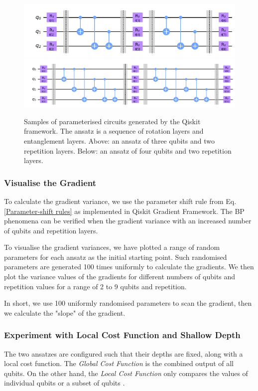 \begin{figure}
    \includegraphics[width=\textwidth]{Artefact/Appendices/ansatz3-2.png}
    \includegraphics[width=\textwidth]{Artefact/Appendices/ansatz4-2.png}
    \caption{
        Samples of parameterised circuits generated by the Qiskit framework.
        The ansatz is a sequence of rotation layers and entanglement layers.
        Above: an ansatz of three qubits and two repetition layers.
        Below: an ansatz of four qubits and two repetition layers.
    }
    \label{Ansatz samples}
\end{figure}

\subsubsection{Visualise the Gradient}
To calculate the gradient variance, we use the parameter shift rule from Eq. \ref{Parameter-shift rules} as implemented in Qiskit Gradient Framework.
The BP phenomena can be verified when the gradient variance with an increased number of qubits and repetition layers.

To visualise the gradient variances, we have plotted a range of random parameters for each ansatz as the initial starting point.
Such randomised parameters are generated 100 times uniformly to calculate the gradients.
We then plot the variance values of the gradients for different numbers of qubits and repetition values for a range of 2 to 9 qubits and repetition.

In short, we use 100 uniformly randomised parameters to scan the gradient, then we calculate the "slope" of the gradient.

\subsubsection{Experiment with Local Cost Function and Shallow Depth}
The two ansatzes are configured such that their depths are fixed, along with a local cost function.
The \textit{Global Cost Function} is the combined output of all qubits. 
On the other hand, the \textit{Local Cost Function} only compares the values of individual qubits or a subset of qubits \cite{cerezoCostFunctionDependent2021}.

